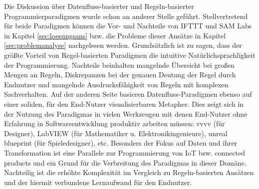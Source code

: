 Die Diskussion über Datenfluss-basierter und Regeln-basierter Programmierparadigmen wurde schon an anderer Stelle geführt. Stellvertretend für beide Paradigmen können die Vor- und Nachteile von IFTTT und SAM Labs in Kapitel \ref{sec:loesungsans} bzw. die Probleme dieser Ansätze in Kapitel \ref{sec:problemanalyse} nachgelesen werden. Grundsätzlich ist zu sagen, dass der größte Vorteil von Regel-basierten Paradigmen die intuitive Natürlichsprachligkeit der Programmierung. Nachteile beinhalten mangelnde Übersicht bei großen Mengen an Regeln, Diskrepanzen bei der genauen Deutung der Regel durch Endnutzer und mangelnde Ausdrucksfähigkeit von Regeln mit komplexen Sachverhalten. Auf der anderen Seite basieren Datenfluss-Paradigmen ebenso auf einer soliden, für den End-Nutzer visualisierbaren Metapher. Dies zeigt sich in der Nutzung des Paradigmas in vielen Werkzeugen mit denen End-Nutzer ohne Erfahrung in Softwareentwicklung produktiv arbeiten müssen: vvvv (für Designer), LabVIEW (für Mathematiker u. Elektronikingenieure), unreal blueprint (für Spieledesigner), etc. Besonders der Fokus auf Daten und ihrer Transformation ist eine Parallele zur Programmierung von \ac{IoT} bzw. connected products und ein Grund für die Verbreitung des Paradigmas in dieser Domäne. Nachteilig ist die erhöhte Komplexität im Vergleich zu Regeln-basierten Ansätzen und der hiermit verbundene Lernaufwand für den Endnutzer.

